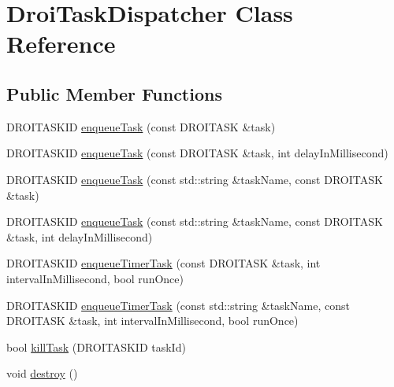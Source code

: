 \hypertarget{class_droi_task_dispatcher}{}\section{Droi\+Task\+Dispatcher Class Reference}
\label{class_droi_task_dispatcher}
\subsection*{Public Member Functions}
\begin{DoxyCompactItemize}
\item 
D\+R\+O\+I\+T\+A\+S\+K\+ID \hyperlink{class_droi_task_dispatcher_a2ba8675d058bbe2e65306381de60030b}{enqueue\+Task} (const D\+R\+O\+I\+T\+A\+SK \&task)
\item 
D\+R\+O\+I\+T\+A\+S\+K\+ID \hyperlink{class_droi_task_dispatcher_abe9f9b40bc6bf45b6cbfd4c77477bbd8}{enqueue\+Task} (const D\+R\+O\+I\+T\+A\+SK \&task, int delay\+In\+Millisecond)
\item 
D\+R\+O\+I\+T\+A\+S\+K\+ID \hyperlink{class_droi_task_dispatcher_aa46d3152580896756a09212f84132a41}{enqueue\+Task} (const std\+::string \&task\+Name, const D\+R\+O\+I\+T\+A\+SK \&task)
\item 
D\+R\+O\+I\+T\+A\+S\+K\+ID \hyperlink{class_droi_task_dispatcher_a1de6e0f3acc8defb136a1e6cd0b28b50}{enqueue\+Task} (const std\+::string \&task\+Name, const D\+R\+O\+I\+T\+A\+SK \&task, int delay\+In\+Millisecond)
\item 
D\+R\+O\+I\+T\+A\+S\+K\+ID \hyperlink{class_droi_task_dispatcher_ab6758842dd6472ccd8681117c703f656}{enqueue\+Timer\+Task} (const D\+R\+O\+I\+T\+A\+SK \&task, int interval\+In\+Millisecond, bool run\+Once)
\item 
D\+R\+O\+I\+T\+A\+S\+K\+ID \hyperlink{class_droi_task_dispatcher_a425fe3f3013d1ad01e59dfe6155b5ffa}{enqueue\+Timer\+Task} (const std\+::string \&task\+Name, const D\+R\+O\+I\+T\+A\+SK \&task, int interval\+In\+Millisecond, bool run\+Once)
\item 
bool \hyperlink{class_droi_task_dispatcher_a00ead6235c3452e2fe41e1f2ebac9a5b}{kill\+Task} (D\+R\+O\+I\+T\+A\+S\+K\+ID task\+Id)
\item 
void \hyperlink{class_droi_task_dispatcher_a678e5ab213ca9da9ff9436aaabddb258}{destroy} ()
\end{DoxyCompactItemize}
